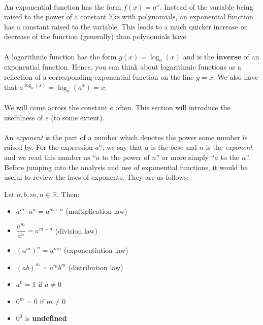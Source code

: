 \documentclass[12pt, a4paper, titlepage, twoside]{article}
\newcommand*{\R}{\mathbb{R}}
\begin{document}
	\paragraph{}
	An exponential function has the form $f(x) = a^x$. Instead of the variable being raised to the power of a constant like with
	polynomials, an exponential function has a constant raised to the variable. This leads to a much quicker increase or decrease of
	the function (generally) than polynomials have.
	
	\paragraph{}
	A logarithmic function has the form $g(x) = \log_a(x)$ and is the \textbf{inverse} of an exponential function. Hence, you can think about 
	logarithmic functions as a reflection of a corresponding exponential function on the line $y=x$. We also have that $a^{\log_a(x)} = 
	\log_a(a^x) = x$.
	
	\paragraph{}
	We will come across the constant $e$ often. This section will introduce the usefulness of $e$ (to some extent).
	
	\paragraph{}
	An \textit{exponent} is the part of a number which denotes the power some number is raised by. For the expression $a^n$, we
	say that $a$ is the \textit{base} and $n$ is the \textit{exponent} and we read this number as ``$a$ to the power of $n$'' or
	more simply ``$a$ to the $n$''. Before jumping into the analysis and use of exponential functions, it would be useful to review the laws 
	of exponents. They are as follows:
	
	\begin{kp}
		Let $a, b, m, n \in \R$. Then:
		
		\begin{itemize}
			\item $a^m \cdot a^n = a^{m+n}$ (multiplication law)
			\item $\dfrac{a^m}{a^n} = a^{m-n}$ (division law)
			\item ${(a^m)}^n = a^{mn}$ (exponentiation law)
			\item $(ab)^m = a^m b^m$ (distribution law)
			\item $a^0 = 1$ if $a \neq 0$
			\item $0^m = 0$ if $m \neq 0$
			\item $0^0$ is \textbf{undefined}
		\end{itemize}
	\end{kp}
	
\end{document}
